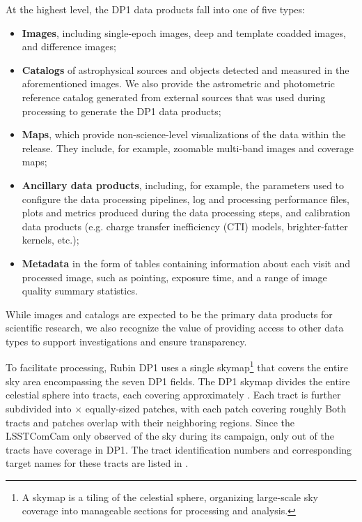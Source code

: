 At the highest level, the DP1 data products fall into one of five types:
\begin{itemize}
\item \textbf{Images}, including single-epoch images, deep and template coadded images, and difference images;
\item \textbf{Catalogs} of astrophysical sources and objects detected and measured in the aforementioned images. We also provide the astrometric and photometric reference catalog generated from external sources that was used during processing to generate the DP1 data products;
\item \textbf{Maps}, which provide non-science-level visualizations of the data within the release. They include, for example, zoomable multi-band images and coverage maps; 
\item \textbf{Ancillary data products}, including, for example, the parameters used to configure the data processing pipelines, log and processing performance files, plots and metrics produced during the data processing steps, and calibration data products (e.g. charge transfer inefficiency (CTI) models, brighter-fatter kernels, etc.);  
\item \textbf{Metadata} in the form of tables containing information about each visit and processed image, such as pointing, exposure time, and a range of image quality summary statistics. 
\end{itemize}
While images and catalogs are expected to be the primary data products for scientific research, we also recognize the value of providing access to other data types to support investigations and ensure transparency.

To facilitate processing, Rubin DP1 uses a single skymap\footnote{A skymap is a tiling of the celestial sphere, organizing large-scale sky coverage into manageable sections for processing and analysis.} that covers the entire sky area encompassing the seven DP1 fields.
The DP1 skymap divides the entire celestial sphere into \ntotaltracts tracts, each covering approximately \tractarea. 
Each tract is further subdivided into \npatchx × \npatchy equally-sized patches, with each patch covering roughly \innerpatcharea 
Both tracts and patches overlap with their neighboring regions.
Since the LSSTComCam only observed \totalarea of the sky during its campaign, only \ncoveredtracts out of the \ntotaltracts tracts have coverage in DP1. 
The tract identification numbers and corresponding target names for these tracts are listed in .
 

